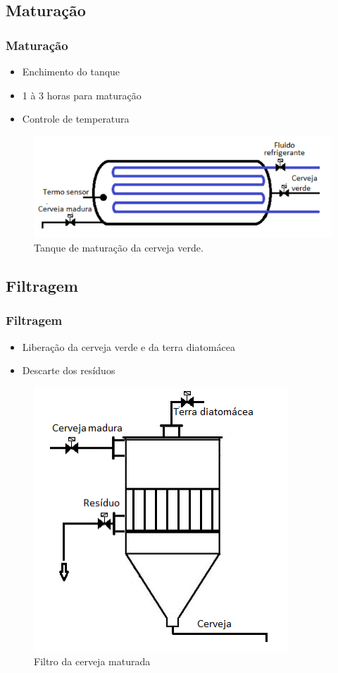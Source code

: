 \documentclass{beamer}
\begin{document}
\subsection{Maturação}
\begin{frame}
\frametitle{Maturação}
\begin{itemize}
	\item Enchimento do tanque
	\item 1 à 3 horas para maturação
	\item Controle de temperatura
\end{itemize}


	\begin{figure}[H]
		\centering
		\includegraphics [width=0.5\linewidth]{tanque.png}
		\caption {Tanque de maturação da cerveja verde.}
		\label{fig:maturador}
	\end{figure}
\end{frame}
\subsection{Filtragem}
\begin{frame}
	\frametitle{Filtragem}
	\begin{itemize}
		\item Liberação da cerveja verde e da terra diatomácea
		\item Descarte dos resíduos
	\end{itemize}
	
	
	\begin{figure}[H]
		\centering
		\includegraphics [width=0.3\linewidth]{filtro.png}
		\caption {Filtro da cerveja maturada}
		\label{fig:filtro}
	\end{figure}
\end{frame}
\end{document}
